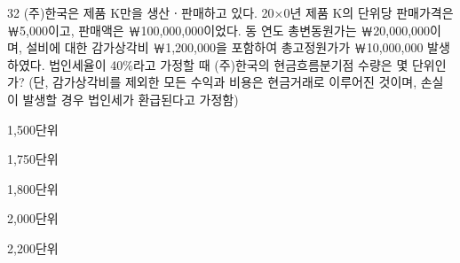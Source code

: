 \begin{question}{32}
(주)한국은 제품 K만을 생산ㆍ판매하고 있다. 20×0년 제품 K의 단위당 판매가격은 ￦5,000이고, 판매액은 ￦100,000,000이었다. 동 연도 총변동원가는 ￦20,000,000이며, 설비에 대한 감가상각비 ￦1,200,000을 포함하여 총고정원가가 ￦10,000,000 발생하였다. 법인세율이 40\%라고 가정할 때 (주)한국의 현금흐름분기점 수량은 몇 단위인가? (단, 감가상각비를 제외한 모든 수익과 비용은 현금거래로 이루어진 것이며, 손실이 발생할 경우 법인세가 환급된다고 가정함)
\begin{choices}
  \item 1,500단위
  \item 1,750단위
  \item 1,800단위
  \item 2,000단위
  \item 2,200단위
\end{choices}
\end{question}
